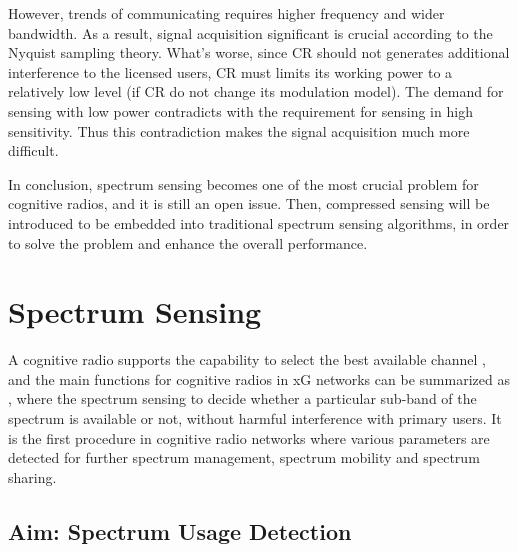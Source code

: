 However, trends of communicating requires higher frequency and wider bandwidth. As a result, signal acquisition significant is crucial according to the Nyquist sampling theory. What's worse, since CR should not generates additional interference to the licensed users, CR must limits its working power to a relatively low level (if CR do not change its modulation model). The demand for sensing with low power contradicts with the requirement for sensing in high sensitivity. Thus this contradiction makes the signal acquisition much more difficult. 

In conclusion, spectrum sensing becomes one of the most crucial problem for cognitive radios, and it is still an open issue. Then, compressed sensing will be introduced to be embedded into traditional spectrum sensing algorithms, in order to solve the problem and enhance the overall performance.

\section{Spectrum Sensing}\label{sct:ssm}

A cognitive radio supports the capability to select the best available channel \cite{akyildiz2006next}, and the main functions for cognitive radios in xG networks can be summarized as \cite{haykin2005cognitive}, where the spectrum sensing to decide whether a particular sub-band of the spectrum is available or not, without harmful interference with primary users. It is the first procedure in cognitive radio networks where various parameters are detected for further spectrum management, spectrum mobility and spectrum sharing. 


\subsection{Aim: Spectrum Usage Detection}\label{sct:aim_ss}


